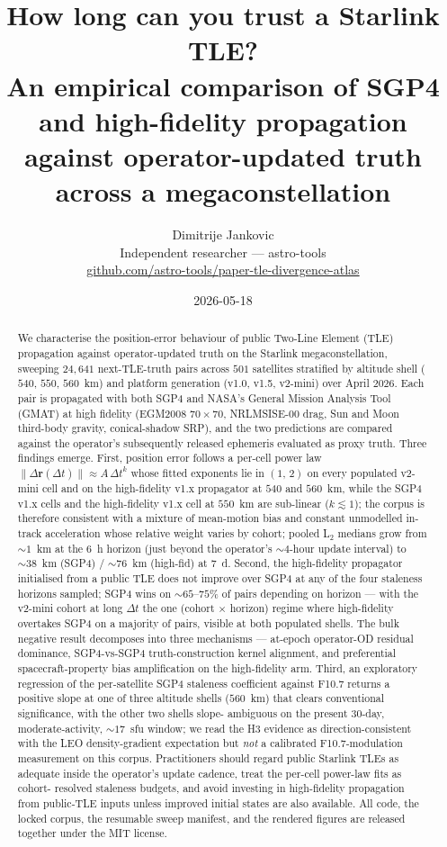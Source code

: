 \documentclass[10pt, letterpaper]{article}
\title{How long can you trust a Starlink TLE? \\
       An empirical comparison of SGP4 and high-fidelity propagation
       against operator-updated truth across a megaconstellation}
\author{Dimitrije Jankovic \\
        \small Independent researcher --- astro-tools \\
        \small \href{https://github.com/astro-tools/paper-tle-divergence-atlas}{github.com/astro-tools/paper-tle-divergence-atlas}}
\date{2026-05-18}
\begin{document}
\maketitle

\begin{abstract}
\noindent
We characterise the position-error behaviour of public Two-Line
Element (TLE) propagation against operator-updated truth on the
Starlink megaconstellation, sweeping $24{,}641$ next-TLE-truth
pairs across $501$ satellites stratified by altitude shell
($540$, $550$, $560$~km) and platform generation (v1.0, v1.5,
v2-mini) over April $2026$. Each pair is propagated with both SGP4
and NASA's General Mission Analysis Tool (GMAT) at high fidelity
(EGM2008 $70\!\times\!70$, NRLMSISE-00 drag, Sun and Moon
third-body gravity, conical-shadow SRP), and the two predictions
are compared against the operator's subsequently released ephemeris
evaluated as proxy truth. Three findings emerge. First, position
error follows a per-cell power law
$\lVert\Delta\mathbf{r}(\Delta t)\rVert \approx A\,\Delta t^{k}$
whose fitted exponents lie in $(1,\,2)$ on every populated v2-mini
cell and on the high-fidelity v1.x propagator at $540$ and $560$~km,
while the SGP4 v1.x cells and the high-fidelity v1.x cell at
$550$~km are sub-linear ($k \lesssim 1$); the corpus is therefore
consistent with a mixture of mean-motion bias and constant unmodelled
in-track acceleration whose relative weight varies by cohort; pooled L$_{2}$ medians grow from
$\sim 1$~km at the $6$~h horizon (just beyond the operator's
$\sim 4$-hour update interval) to $\sim 38$~km (SGP4) /
$\sim 76$~km (high-fid) at $7$~d. Second, the high-fidelity
propagator initialised from a public TLE does not improve over
SGP4 at any of the four staleness horizons sampled; SGP4 wins on
$\sim 65$--$75\%$ of pairs depending on horizon --- with the
v2-mini cohort at long $\Delta t$ the one (cohort $\times$ horizon)
regime where high-fidelity overtakes SGP4 on a majority of pairs,
visible at both populated shells. The bulk negative result
decomposes into three mechanisms --- at-epoch operator-OD
residual dominance, SGP4-vs-SGP4 truth-construction kernel
alignment, and preferential spacecraft-property bias amplification
on the high-fidelity arm. Third, an exploratory regression of the
per-satellite SGP4 staleness coefficient against F10.7 returns a
positive slope at one of three altitude shells ($560$~km) that
clears conventional significance, with the other two shells slope-
ambiguous on the present $30$-day, moderate-activity, $\sim 17$~sfu
window; we read the H3 evidence as direction-consistent with the
LEO density-gradient expectation but \emph{not} a calibrated
F10.7-modulation measurement on this corpus. Practitioners
should regard public Starlink TLEs as adequate inside the operator's
update cadence, treat the per-cell power-law fits as cohort-
resolved staleness budgets, and avoid investing in
high-fidelity propagation from public-TLE inputs unless improved
initial states are also available. All code, the locked corpus,
the resumable sweep manifest, and the rendered figures are
released together under the MIT license.
\end{abstract}
\end{document}
